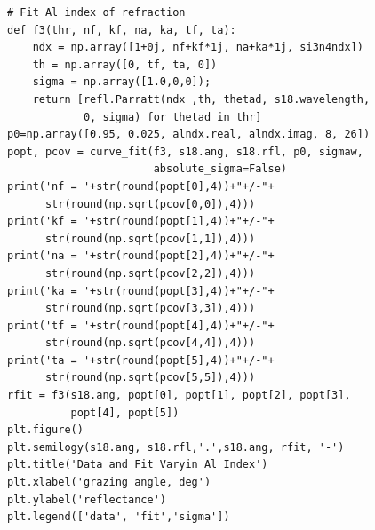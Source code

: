 \documentclass[english]{scrartcl}
\begin{document}
\begin{lstlisting}
# Fit Al index of refraction
def f3(thr, nf, kf, na, ka, tf, ta):
    ndx = np.array([1+0j, nf+kf*1j, na+ka*1j, si3n4ndx])
    th = np.array([0, tf, ta, 0])
    sigma = np.array([1.0,0,0]);
    return [refl.Parratt(ndx ,th, thetad, s18.wavelength,
    		0, sigma) for thetad in thr]
p0=np.array([0.95, 0.025, alndx.real, alndx.imag, 8, 26])
popt, pcov = curve_fit(f3, s18.ang, s18.rfl, p0, sigmaw,
                       absolute_sigma=False)
print('nf = '+str(round(popt[0],4))+"+/-"+
      str(round(np.sqrt(pcov[0,0]),4)))
print('kf = '+str(round(popt[1],4))+"+/-"+
      str(round(np.sqrt(pcov[1,1]),4)))
print('na = '+str(round(popt[2],4))+"+/-"+
      str(round(np.sqrt(pcov[2,2]),4)))
print('ka = '+str(round(popt[3],4))+"+/-"+
      str(round(np.sqrt(pcov[3,3]),4)))
print('tf = '+str(round(popt[4],4))+"+/-"+
      str(round(np.sqrt(pcov[4,4]),4)))
print('ta = '+str(round(popt[5],4))+"+/-"+
      str(round(np.sqrt(pcov[5,5]),4)))
rfit = f3(s18.ang, popt[0], popt[1], popt[2], popt[3],
	      popt[4], popt[5])
plt.figure()
plt.semilogy(s18.ang, s18.rfl,'.',s18.ang, rfit, '-')
plt.title('Data and Fit Varyin Al Index')
plt.xlabel('grazing angle, deg')
plt.ylabel('reflectance')
plt.legend(['data', 'fit','sigma'])
\end{lstlisting}
\end{document}

